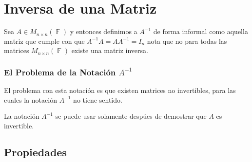 \documentclass[12pt, fleqn]{report}                             %
\theoremstyle{break}                                            %
\DeclareMathOperator \GenericField {\mathbb{F}}                 %
\begin{document}
                    
           

        
                    
                    







        \clearpage
        \section{Inversa de una Matriz}

            Sea $A \in M_{n \times n}(\GenericField)$ y entonces definimos a $A^{-1}$ 
            de forma informal como aquella matriz que cumple con que $A^{-1}A = AA^{-1} = I_{n}$
            nota que no para todas las matrices $M_{n \times n}(\GenericField)$ existe una matriz inversa.


           \subsubsection*{El Problema de la Notación $A^{-1}$}

           El problema con esta notación es que existen matrices no invertibles, para las cuales
           la notación $A^{-1}$ no tiene sentido.

           La notación $A^{-1}$ se puede usar solamente despúes de demostrar que $A$ es invertible.

            \clearpage
            \subsection{Propiedades}
\end{document}
